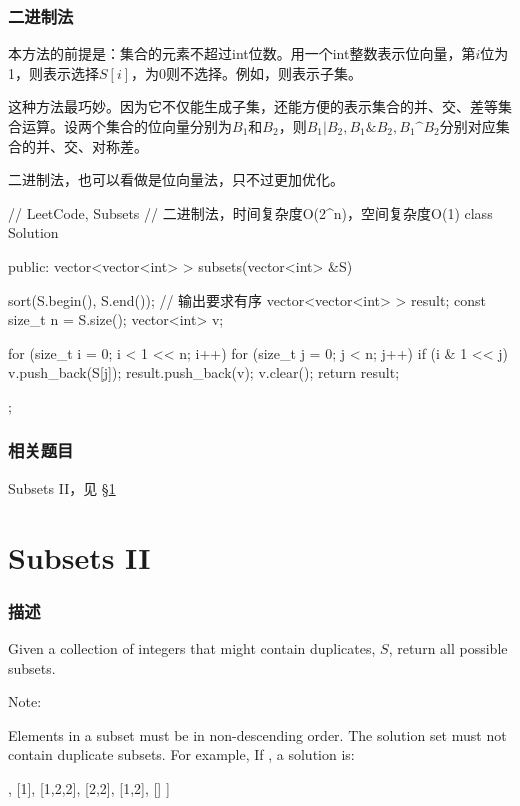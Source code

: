 \subsubsection{二进制法}
本方法的前提是：集合的元素不超过int位数。用一个int整数表示位向量，第$i$位为1，则表示选择$S[i]$，为0则不选择。例如，则表示子集。

这种方法最巧妙。因为它不仅能生成子集，还能方便的表示集合的并、交、差等集合运算。设两个集合的位向量分别为$B_1$和$B_2$，则$B_1|B_2, B_1 \& B_2, B_1 \^ B_2$分别对应集合的并、交、对称差。

二进制法，也可以看做是位向量法，只不过更加优化。

\begin{Code}
// LeetCode, Subsets
// 二进制法，时间复杂度O(2^n)，空间复杂度O(1)
class Solution {
public:
    vector<vector<int> > subsets(vector<int> &S) {
        sort(S.begin(), S.end()); // 输出要求有序
        vector<vector<int> > result;
        const size_t n = S.size();
        vector<int> v;

        for (size_t i = 0; i < 1 << n; i++) {
            for (size_t j = 0; j < n; j++) {
                if (i & 1 << j) v.push_back(S[j]);
            }
            result.push_back(v);
            v.clear();
        }
        return result;
    }
};
\end{Code}


\subsubsection{相关题目}
\begindot
\item Subsets II，见 \S \ref{sec:subsets-ii}
\myenddot


\section{Subsets II} %
\label{sec:subsets-ii}


\subsubsection{描述}
Given a collection of integers that might contain duplicates, $S$, return all possible subsets.

Note:

Elements in a subset must be in non-descending order.
The solution set must not contain duplicate subsets.
For example,
If , a solution is:
\begin{Code}
[
  [2],
  [1],
  [1,2,2],
  [2,2],
  [1,2],
  []
]
\end{Code}


